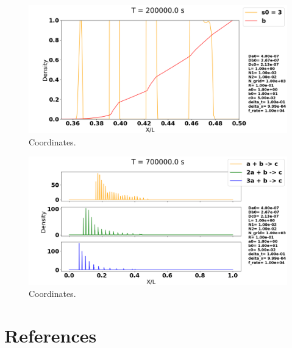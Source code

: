 \documentclass[1p]{elsarticle}        	%
\begin{document}
\begin{figure}
	\centering
	\includegraphics[width=\linewidth]{../figures/s0_3.png}
	\caption{Coordinates.}
	\label{fig:coords}
\end{figure}

\begin{figure}
	\centering
	\includegraphics[width=\linewidth]{../figures/2a_s.png}
	\caption{Coordinates.}
	\label{fig:coords}
\end{figure}






\section*{References}

  
\end{document}
